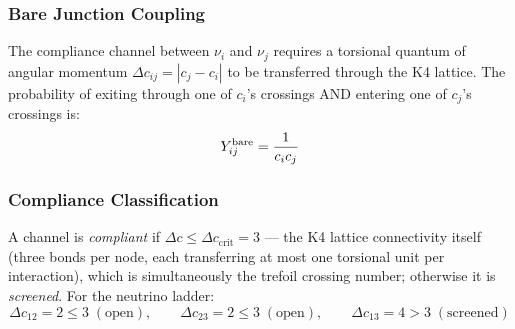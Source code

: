\subsubsection{Bare Junction Coupling}

The compliance channel between $\nu_i$ and $\nu_j$ requires a torsional quantum of angular momentum $\Delta c_{ij} = |c_j - c_i|$ to be transferred through the K4 lattice.  The probability of exiting through one of $c_i$'s crossings AND entering one of $c_j$'s crossings is:
\begin{equation}
    Y_{ij}^{\rm bare} = \frac{1}{c_i c_j}
\end{equation}

\subsubsection{Compliance Classification}

A channel is \emph{compliant} if $\Delta c \le \Delta c_\text{crit} = 3$ --- the K4 lattice
connectivity itself (three bonds per node, each transferring at most one torsional unit per
interaction), which is simultaneously the trefoil crossing number; otherwise it is
\emph{screened}.  For the neutrino
ladder:
\[
    \Delta c_{12} = 2 \le 3 \;(\text{open}),\qquad
    \Delta c_{23} = 2 \le 3 \;(\text{open}),\qquad
    \Delta c_{13} = 4 > 3 \;(\text{screened})
\]

